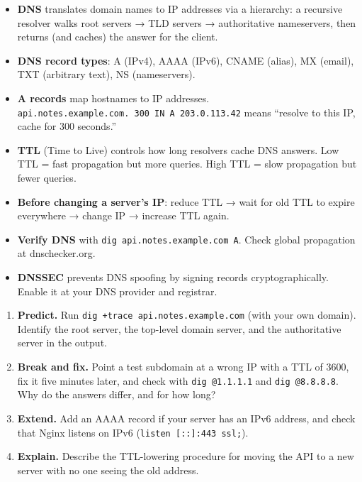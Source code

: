 \label{27-domain-and-dns:key-takeaways}
\begin{takeaways}

\begin{itemize}
\tightlist
\item
  \textbf{DNS} translates domain names to IP addresses via a hierarchy: a recursive resolver walks root servers → TLD servers → authoritative nameservers, then returns (and caches) the answer for the client.
\item
  \textbf{DNS record types}: A (IPv4), AAAA (IPv6), CNAME (alias), MX (email), TXT (arbitrary text), NS (nameservers).
\item
  \textbf{A records} map hostnames to IP addresses. \texttt{api.}\allowbreak{}\texttt{notes.}\allowbreak{}\texttt{example.}\allowbreak{}\texttt{com.}\allowbreak{}\texttt{\ 300\ IN\ A\ 203.}\allowbreak{}\texttt{0.}\allowbreak{}\texttt{113.}\allowbreak{}\texttt{42} means ``resolve to this IP, cache for 300 seconds.''
\item
  \textbf{TTL} (Time to Live) controls how long resolvers cache DNS answers. Low TTL = fast propagation but more queries. High TTL = slow propagation but fewer queries.
\item
  \textbf{Before changing a server's IP}: reduce TTL → wait for old TTL to expire everywhere → change IP → increase TTL again.
\item
  \textbf{Verify DNS} with \texttt{dig\ api.}\allowbreak{}\texttt{notes.}\allowbreak{}\texttt{example.}\allowbreak{}\texttt{com\ A}. Check global propagation at dnschecker.org.
\item
  \textbf{DNSSEC} prevents DNS spoofing by signing records cryptographically. Enable it at your DNS provider and registrar.
\end{itemize}

\end{takeaways}

\label{27-domain-and-dns:exercises}

\begin{enumerate}
\def\labelenumi{\arabic{enumi}.}
\tightlist
\item
  \textbf{Predict.} Run \texttt{dig\ +trace\ api.}\allowbreak{}\texttt{notes.}\allowbreak{}\texttt{example.}\allowbreak{}\texttt{com} (with your own domain). Identify the root server, the top-level domain server, and the authoritative server in the output.
\item
  \textbf{Break and fix.} Point a test subdomain at a wrong IP with a TTL of 3600, fix it five minutes later, and check with \texttt{dig\ @1.1.1.1} and \texttt{dig\ @8.8.8.8}. Why do the answers differ, and for how long?
\item
  \textbf{Extend.} Add an AAAA record if your server has an IPv6 address, and check that Nginx listens on IPv6 (\texttt{listen\ {[}::{]}:443\ ssl;}).
\item
  \textbf{Explain.} Describe the TTL-lowering procedure for moving the API to a new server with no one seeing the old address.
\end{enumerate}

